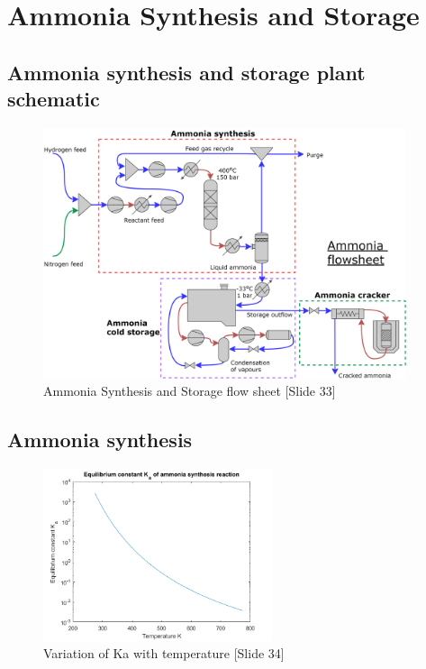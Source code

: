 






%


\section{Ammonia Synthesis and Storage}

    \subsection{Ammonia synthesis and storage plant schematic}
    \begin{figure}[H]
        \centering
        \includegraphics[width=0.95\textwidth]{ammoniasynth/handout/graphics/SSflowsheet.png}
        \caption{Ammonia Synthesis and Storage flow sheet [Slide 33]}
        \label{fig:SSflow}
    \end{figure}
   
    
    \subsection{Ammonia synthesis}
    
    
    \begin{figure}[H]
        \centering
        \includegraphics[width=0.60\textwidth]{ammoniasynth/handout/graphics/kc.png}
        \caption{Variation of Ka with temperature [Slide 34]}
        \label{fig:ka}
    \end{figure}
    
